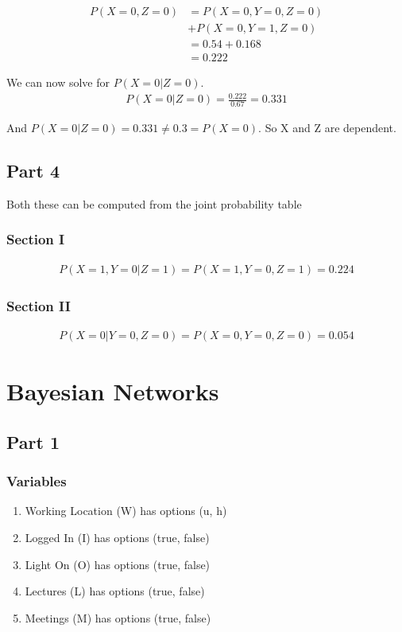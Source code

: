 \documentclass[a4paper, 12pt]{article}
\begin{document}
				\begin{equation}
					\begin{split}
						P(X=0,Z=0) & = P(X=0,Y=0,Z=0)
						\\
						& + P(X=0,Y=1,Z=0)
						\\
						& = 0.54 + 0.168
						\\
						& = 0.222
					\end{split}
				\end{equation}
				
				We can now solve for $P(X=0|Z=0)$.
				\begin{align*}
					P(X=0|Z=0) = \frac{0.222}{0.67} = 0.331
				\end{align*}
				
				And $P(X=0|Z=0) = 0.331 \neq 0.3 = P(X=0)$. So X and Z are dependent.
				
		\subsection{Part 4}
			Both these can be computed from the joint probability table		
		
			\subsubsection{Section I}
				\begin{align*}
					P(X=1,Y=0|Z=1) = P(X=1,Y=0,Z=1) = 0.224
				\end{align*}
			
			\subsubsection{Section II}
				\begin{align*}
					P(X=0|Y=0,Z=0) = P(X=0,Y=0,Z=0) = 0.054
				\end{align*}
	\section{Bayesian Networks}
		\subsection{Part 1}
			\subsubsection{Variables}
				\begin{enumerate}
					\item Working Location (W) has options (u, h)
					\item Logged In (I) has options (true, false)
					\item Light On (O) has options (true, false)
					\item Lectures (L) has options (true, false)
					\item Meetings (M) has options (true, false)
				\end{enumerate}
				
\end{document}
